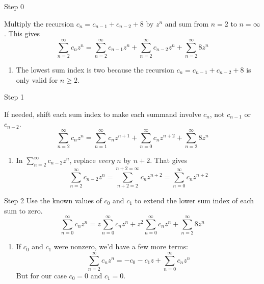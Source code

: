 \documentclass[portrait,fleqn,12pt]{beamer}
\newenvironment{handlist}
   {\begin{enumerate}[\faHandPointRight]
       \addtolength{\itemsep}{0.0\itemsep}}
     {\end{enumerate}}
\begin{document}
\begin{frame}{Step 0}

Multiply the recursion $c_n = c_{n-1} + c_{n-2}+ 8$ by $z^n$ and sum from $n=2$ to $n=\infty$.  This gives
\begin{equation}
  \sum_{n=2}^\infty c_{n} z^n  =  \sum_{n=2}^\infty c_{n-1} z^n +  \sum_{n=2}^\infty c_{n-2} z^n +  \sum_{n=2}^\infty 8 z^n
\end{equation}
\begin{handlist}
\item The lowest sum index is two because the recursion  $c_n = c_{n-1} + c_{n-2}+ 8$ is only valid for $n \geq 2$.
\end{handlist}
\end{frame}
\begin{frame}{Step 1}

If needed, shift each sum index to make each summand involve $c_n$, not $c_{n-1}$ or $c_{n-2}$.
\begin{equation}
  \sum_{n=2}^\infty c_{n} z^n  =  \sum_{n=1}^\infty c_{n} z^{n+1} +  \sum_{n=0}^\infty c_{n} z^{n+2} +  \sum_{n=2}^\infty 8 z^n
\end{equation}
\begin{handlist}
\item In $ \sum_{n=2}^\infty c_{n-2} z^n$, replace \emph{every} $n$ by $n+2$. That gives
\begin{equation}
  \sum_{n=2}^\infty c_{n-2} z^n =  \sum_{n+2=2}^{n+2 = \infty} c_{n} z^{n+2} = \sum_{n=0}^{\infty} c_{n} z^{n+2}
\end{equation}
\end{handlist}
\end{frame}

\begin{frame}{Step 2}
Use the known values of $c_0$ and $c_1$ to extend the lower sum index of each sum to zero.
\begin{equation}
  \sum_{n=0}^\infty c_{n} z^n  =  z \sum_{n=0}^\infty c_{n} z^{n} +  z^2 \sum_{n=0}^\infty c_{n} z^{n} +  \sum_{n=2}^\infty 8 z^n
\end{equation}
\begin{handlist}
\item If $c_0$ and $c_1$ were nonzero, we'd have a few more terms:
\begin{equation}
  \sum_{n=2}^\infty c_{n} z^n = -c_0 - c_1 z + \sum_{n=0}^\infty c_{n} z^n
\end{equation}
But for our case $c_0 = 0$ and $c_1 = 0$.
\end{handlist}
\end{frame}
\end{document}
